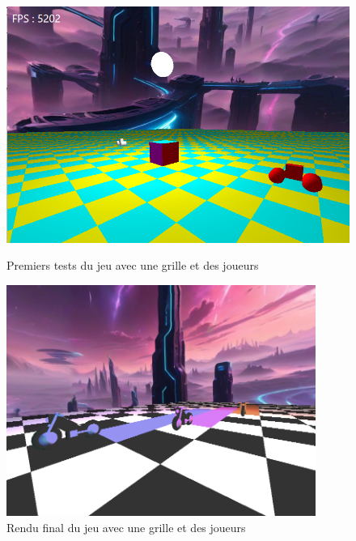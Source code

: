 \begin{figure}[htbp]
    \vspace{1em} %
    
    \begin{minipage}{0.45\textwidth}
        \centering
        \includegraphics[width=\textwidth]{images/GraphicFirstGame.png}
        \caption{Premiers tests du jeu avec une grille et des joueurs}
    \end{minipage}%
    \hfill
    \begin{minipage}{0.45\textwidth}
        \centering
        \includegraphics[width=0.9\textwidth]{images/GraphicFinalGame.png}
        \caption{Rendu final du jeu avec une grille et des joueurs}
    \end{minipage}
\end{figure}
